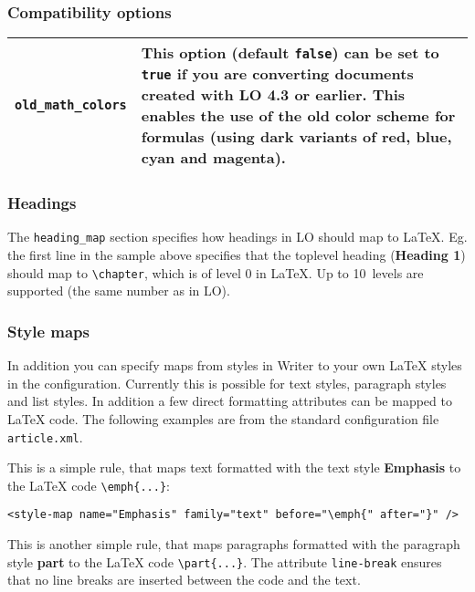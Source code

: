 \documentclass{article}
\newcommand\textstyleSourceText[1]{\texttt{\textmd{#1}}}
\begin{document}
\subsubsection{Compatibility options}
\begin{flushleft}
\begin{tabular}{|l|l|}

\hline
\textstyleSourceText{old\_math\_colors} & This option (default \textstyleSourceText{false}) can be set to \textstyleSourceText{true} if you are converting documents created with LO 4.3 or earlier. This enables the use of the old color scheme for formulas (using dark variants of red, blue, cyan and magenta).\\\hline
\end{tabular}
\end{flushleft}
\subsubsection{Headings}
{\mdseries
The \textstyleSourceText{heading\_map} section specifies how headings in LO should map to LaTeX. Eg. the first line in the sample above specifies that the toplevel heading (\textbf{Heading 1}) should map to \textstyleSourceText{{\textbackslash}chapter}, which is of level 0 in LaTeX. Up to 10~levels are supported (the same number as in LO).}

\subsubsection{Style maps}
{\mdseries
In addition you can specify maps from styles in Writer to your own LaTeX styles in the configuration. Currently this is possible for text styles, paragraph styles and list styles. In addition a few direct formatting attributes can be mapped to LaTeX code. The following examples are from the standard configuration file \textstyleSourceText{article.xml}.}

{\mdseries
This is a simple rule, that maps text formatted with the text style \textbf{Emphasis} to the LaTeX code \textstyleSourceText{{\textbackslash}emph\{...\}}:}

\begin{verbatim}
<style-map name="Emphasis" family="text" before="\emph{" after="}" />
\end{verbatim}
{\mdseries
This is another simple rule, that maps paragraphs formatted with the paragraph style \textbf{part} to the LaTeX code \textstyleSourceText{{\textbackslash}part\{...\}}. The attribute \textstyleSourceText{line-break} ensures that no line breaks are inserted between the code and the text.}
\end{document}
